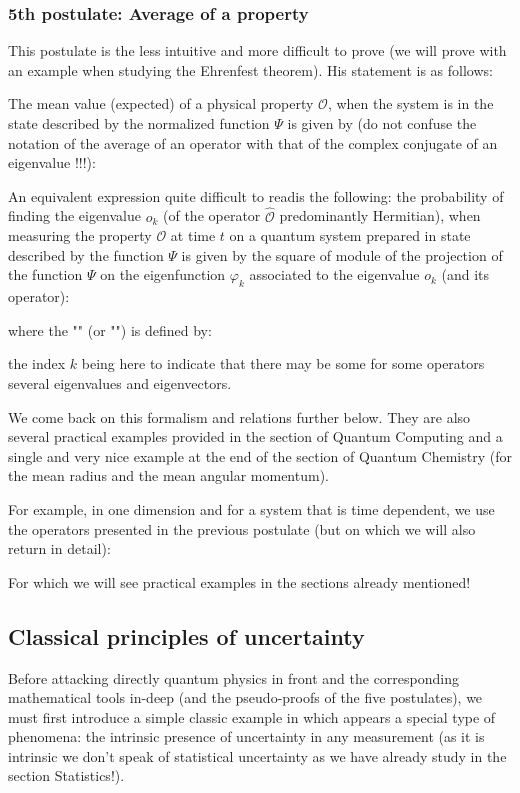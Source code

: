 	\subsubsection{5th postulate: Average of a property}\label{fifth postulate of wave quantum physics}
	This postulate is the less intuitive and more difficult to prove (we will prove with an example when studying the Ehrenfest theorem). His statement is as follows:

	The mean value (expected) of a physical property $\mathcal{O}$, when the system is in the state described by the normalized function $\Psi$ is given by (do not confuse the notation of the average of an operator with that of the complex conjugate of an eigenvalue !!!):
	
	An equivalent expression quite difficult to readis the following: the probability of finding the eigenvalue $o_k$ (of the operator $\hat{\mathcal{O}}$ predominantly Hermitian), when measuring the property $\mathcal{O}$ at time $t$ on a quantum system prepared in state described by the function $\Psi$ is given by the square of module of the projection of the function $\Psi$ on the eigenfunction $\varphi_k$ associated to the eigenvalue $o_k$ (and its operator):
	
	where the "" (or "") is defined by:
	
	the index $k$ being here to indicate that there may be some for some operators several eigenvalues and eigenvectors.
	\begin{tcolorbox}[title=Remark,colframe=black,arc=10pt]
	We come back on this formalism and relations further below. They are also several practical examples provided in the section of Quantum Computing and a single and very nice example at the end of the section of Quantum Chemistry (for the mean radius and the mean angular momentum).
	\end{tcolorbox}
	For example, in one dimension and for a system that is time dependent, we use the operators presented in the previous postulate (but on which we will also return in detail):
	
	For which we will see practical examples in the sections already mentioned!
	
	\pagebreak
	\subsection{Classical principles of uncertainty}
	Before attacking directly quantum physics in front and the corresponding mathematical tools in-deep (and the pseudo-proofs of the five postulates), we must first introduce a simple classic example in which appears a special type of phenomena: the intrinsic presence of uncertainty in any measurement (as it is intrinsic we don't speak of statistical uncertainty as we have already study in the section Statistics!).
	
